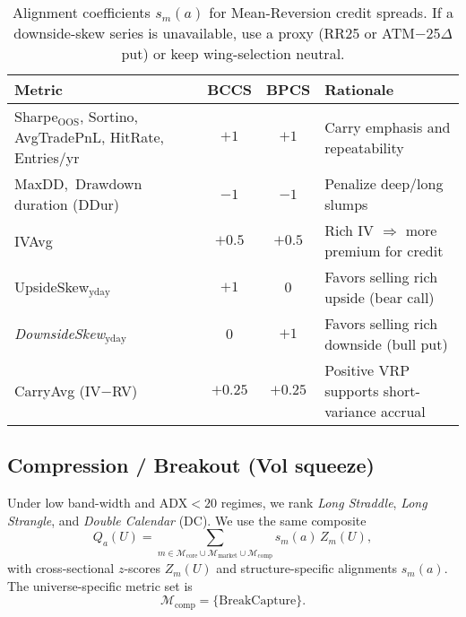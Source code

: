\documentclass[12pt,a4paper]{report}
\begin{document}
\begin{table}[h]
\centering
\begin{tabular}{lccp{7.1cm}}
\toprule
\textbf{Metric} & \textbf{BCCS} & \textbf{BPCS} & \textbf{Rationale} \\
\midrule
Sharpe$_{\text{OOS}}$, Sortino, AvgTradePnL, HitRate, Entries/yr & $+1$ & $+1$ & Carry emphasis and repeatability \\
MaxDD,\ Drawdown duration (DDur) & $-1$ & $-1$ & Penalize deep/long slumps \\
IVAvg & $+0.5$ & $+0.5$ & Rich IV $\Rightarrow$ more premium for credit \\
UpsideSkew$_{\text{yday}}$ & $+1$ & $0$ & Favors selling rich upside (bear call) \\
\emph{DownsideSkew}$_{\text{yday}}$ & $0$ & $+1$ & Favors selling rich downside (bull put) \\
CarryAvg (IV$-$RV) & $+0.25$ & $+0.25$ & Positive VRP supports short-variance accrual \\
\bottomrule
\end{tabular}
\caption{Alignment coefficients $s_m(a)$ for Mean-Reversion credit spreads. If a downside-skew series is unavailable, use a proxy (RR25 or ATM$-$25$\Delta$ put) or keep wing-selection neutral.}
\label{tab:align-mr}
\end{table}


\subsection{Compression / Breakout (Vol squeeze)}
Under low band-width and $\mathrm{ADX}<20$ regimes, we rank \emph{Long Straddle}, \emph{Long Strangle}, and \emph{Double Calendar} (DC). We use the same composite
\[
Q_a(U)=\sum_{m\in \mathcal{M}_{\text{core}}\cup\mathcal{M}_{\text{market}}\cup\mathcal{M}_{\text{comp}}}
s_m(a)\,Z_m(U),
\]
with cross-sectional $z$-scores $Z_m(U)$ and structure-specific alignments $s_m(a)$. The universe-specific metric set is
\[
\mathcal{M}_{\text{comp}}=\{\mathrm{BreakCapture}\}.
\]
\end{document}
